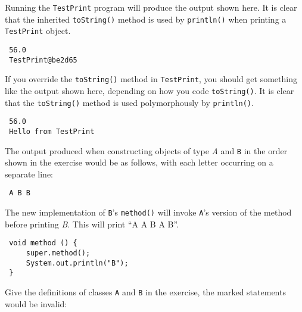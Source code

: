 \secANSHleft
\begin{ANS}

\item Running the {\tt TestPrint} program will produce the 
output shown here. It is clear that the inherited {\tt toString()}
method is used by {\tt println()} when printing a {\tt TestPrint}
object.  

\begin{jjjlisting}
\begin{lstlisting}
 56.0
 TestPrint@be2d65
\end{lstlisting}
\end{jjjlisting}

\item If you override the {\tt toString()} method in {\tt TestPrint},
you should get something like the output shown here, depending on how
you code {\tt toString()}.  It is clear that the {\tt toString()}
method is used polymorphously by {\tt println()}.

\begin{jjjlisting}
\begin{lstlisting}
 56.0
 Hello from TestPrint
\end{lstlisting}
\end{jjjlisting}

\item The output produced when constructing objects of type {\em A}
and {\tt B} in the order shown in the exercise would be as follows,
with each letter occurring on a separate line:

\begin{jjjlisting}
\begin{lstlisting}
 A B B
\end{lstlisting}
\end{jjjlisting}

\item The new implementation of {\tt B}'s {\tt method()} will
invoke {\tt A}'s version of the method before printing {\em B}.
This will print ``A A B A B''.

\begin{jjjlisting}
\begin{lstlisting}
 void method () { 
     super.method();  
     System.out.println("B");
 }
\end{lstlisting}
\end{jjjlisting}

\item Give the definitions of classes {\tt A} and {\tt B} in the
exercise, the marked statements would be invalid:


\end{ANS}

